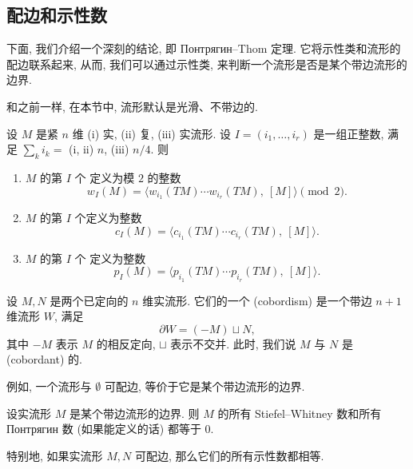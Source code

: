 \subsection{配边和示性数}

下面, 我们介绍一个深刻的结论, 即 Понтрягин--Thom 定理.
它将示性类和流形的配边联系起来, 从而, 我们可以通过示性类,
来判断一个流形是否是某个带边流形的边界.

和之前一样, 在本节中, 流形默认是光滑、不带边的.

\begin{definition}
    设 $M$ 是紧 $n$ 维 (i) 实, (ii) 复, (iii) 实流形.
    设 $I = (i_1, \dotsc, i_r)$ 是一组正整数, 满足 $\sum_k i_k =$ (i, ii) $n$, (iii) $n/4$. 则
    \begin{enumerate}
        \item
            $M$ 的第 $I$ 个 定义为模 $2$ 的整数
            \[ w_I (M) = \bigl\langle w_{i_1} (TM) \cdots w_{i_r} (TM) ,\ [M] \bigr\rangle \pmod {2}. \]
        \item
            $M$ 的第 $I$ 个定义为整数
            \[ c_I (M) = \bigl\langle c_{i_1} (TM) \cdots c_{i_r} (TM) ,\ [M] \bigr\rangle. \]
        \item
            $M$ 的第 $I$ 个 定义为整数
            \[ p_I (M) = \bigl\langle p_{i_1} (TM) \cdots p_{i_r} (TM) ,\ [M] \bigr\rangle. \]
    \end{enumerate}
\end{definition}

\begin{definition}
    设 $M, N$ 是两个已定向的 $n$ 维实流形. 它们的一个 (cobordism)
    是一个带边 $n+1$ 维流形 $W$, 满足 
    \[ \partial W = (-M) \sqcup N, \]
    其中 $-M$ 表示 $M$ 的相反定向, $\sqcup$ 表示不交并.
    此时, 我们说 $M$ 与 $N$ 是 (cobordant) 的.
\end{definition}

例如, 一个流形与 $\emptyset$ 可配边, 等价于它是某个带边流形的边界.

\begin{theorem}
    设实流形 $M$ 是某个带边流形的边界.
    则 $M$ 的所有 Stiefel--Whitney 数和所有 Понтрягин 数 (如果能定义的话) 都等于 $0$.

    特别地, 如果实流形 $M, N$ 可配边,
    那么它们的所有示性数都相等.
\end{theorem}

